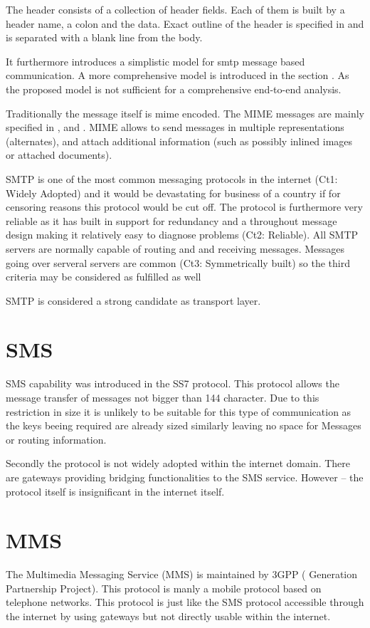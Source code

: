 The header consists of a collection of header fields. Each of them is built by a header name, a colon and the data. Exact outline of the header is specified in \cite{RFC5322} and is separated with a blank line from the body. 

It \cite{RFC5321} furthermore introduces a simplistic model for smtp message based communication. A more comprehensive model is introduced in the section . As the proposed model is not sufficient for a comprehensive end-to-end analysis.\par

Traditionally the message itself is mime encoded. The MIME messages are mainly specified in \cite{RFC2045}, and \cite{RFC2046}. MIME allows to send messages in multiple representations (alternates), and attach additional information (such as possibly inlined images or attached documents). 

SMTP is one of the most common messaging protocols in the internet (Ct1: Widely Adopted) and it would be devastating for business of a country if for censoring reasons this protocol would be cut off. The protocol is furthermore very reliable as it has built in support for redundancy and a throughout message design making it relatively easy to diagnose problems (Ct2: Reliable). All SMTP servers are normally capable of routing and and receiving messages. Messages going over serveral servers are common (Ct3: Symmetrically built) so the third criteria may be considered as fulfilled as well

SMTP is considered a strong candidate as transport layer.  

\section{SMS}
SMS capability was introduced in the SS7 protocol. This protocol allows the message transfer of messages not bigger than 144 character. Due to this restriction in size it is unlikely to be suitable for this type of communication as the keys beeing required are already sized similarly leaving no space for Messages or routing information.

Secondly the protocol is not widely adopted within the internet domain. There are gateways providing bridging functionalities to the SMS service. However -- the protocol itself is insignificant in the internet itself. 

\section{MMS}
The Multimedia Messaging Service (MMS) is maintained by 3GPP ( Generation Partnership Project). This protocol is manly a mobile protocol based on telephone networks. This protocol is just like the SMS protocol accessible through the internet by using gateways but not directly usable within the internet.

